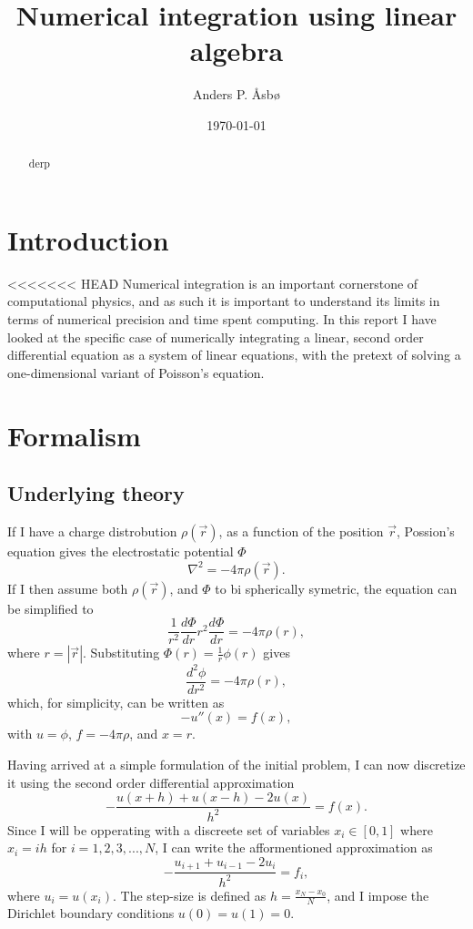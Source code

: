 \documentclass[english,notitlepage]{revtex4-1}  %
\begin{document}
\title{Numerical integration using linear algebra}   %
\author{Anders P. Åsbø}               %
\date{\today}
\noaffiliation                            %

\begin{abstract}
derp
\end{abstract}

\maketitle
\tableofcontents

\section{Introduction}\label{sec:1}
<<<<<<< HEAD
Numerical integration is an important cornerstone of computational physics, and as such it is important to understand its limits in terms of numerical precision and time spent computing. In this report I have looked at the specific case of numerically integrating a linear, second order differential equation as a system of linear equations, with the pretext of solving a one-dimensional variant of Poisson's equation.

\section{Formalism}\label{sec:2}
\subsection{Underlying theory}\label{subsec:21}
If I have a charge distrobution \(\rho(\vec{r})\), as a function of the position \(\vec{r}\), Possion's equation gives the electrostatic potential \(\Phi\)
$$
	\nabla^{2}=-4\pi\rho(\vec{r}).	
$$
If I then assume both \(\rho(\vec{r})\), and \(\Phi\) to bi spherically symetric, the equation can be simplified to
$$
	\frac{1}{r^{2}}\frac{d\Phi}{dr}r^{2}\frac{d\Phi}{dr}=-4\pi\rho(r),
$$
where \(r=|\vec{r}|\). Substituting \(\Phi(r)=\frac{1}{r}\phi(r)\) gives
$$
	\frac{d^{2}\phi}{dr^{2}}=-4\pi\rho(r),
$$
which, for simplicity, can be written as
$$
	-u''(x)=f(x),
$$
with \(u = \phi\), \(f=-4\pi\rho\), and \(x = r\).

Having arrived at a simple formulation of the initial problem, I can now discretize it using the second order differential approximation
$$
	-\frac{u(x+h)+u(x-h)-2u(x)}{h^{2}}=f(x).
$$
Since I will be opperating with a discreete set of variables \(x_{i}\in[0,1]\) where \(x_{i}=ih\) for \(i=1,2,3,...,N\), I can write the afformentioned approximation as
$$
	-\frac{u_{i+1}+u_{i-1}-2u_{i}}{h^{2}}=f_{i},
$$
where \(u_{i}=u(x_{i})\). The step-size is defined as \(h=\frac{x_{N}-x_{0}}{N}\), and I impose the Dirichlet boundary conditions \(u(0)=u(1)=0\).
\end{document}
